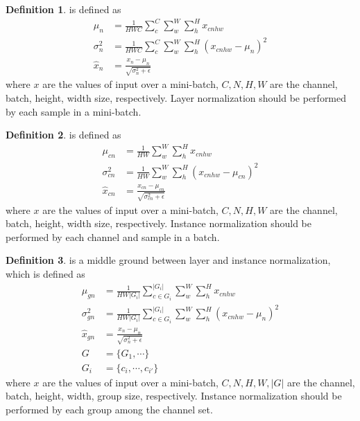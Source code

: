 \documentclass[a4paper]{article}
\theoremstyle{definition}
\newtheorem{definition}{Definition}
\theoremstyle{plain}
\begin{document}
\begin{definition}
 is defined as
\begin{align*}
     \mu_{n}&=\frac{1}{HWC}\sum^C_c\sum^W_w\sum^H_h x_{cnhw}\\
     \sigma_{n}^2&=\frac{1}{HWC}\sum^C_c\sum^W_w\sum^H_h(x_{cnhw}-\mu_n)^2\\
     \hat{x}_{n}&=\frac{x_{n}-\mu_{n}}{\sqrt{\sigma_{n}^2+\epsilon}}
\end{align*}
where $x$ are the values of input over a mini-batch, $C,N,H,W$ are the channel, batch, height, width size, respectively. Layer normalization should be performed by each sample in a mini-batch.
\end{definition}

\begin{definition}
 is defined as
\begin{align*}
     \mu_{cn}&=\frac{1}{HW}\sum^W_w\sum^H_h x_{cnhw}\\
     \sigma_{cn}^2&=\frac{1}{HW}\sum^W_w\sum^H_h(x_{cnhw}-\mu_{cn})^2\\
     \hat{x}_{cn}&=\frac{x_{cn}-\mu_{cn}}{\sqrt{\sigma_{cn}^2+\epsilon}}
\end{align*}
where $x$ are the values of input over a mini-batch, $C,N,H,W$ are the channel, batch, height, width size, respectively. Instance normalization should be performed by each channel and sample in a batch.
\end{definition}

\begin{definition}
\cite{group} is a middle ground between layer and instance normalization, which is defined as
\begin{align*}
     \mu_{gn}&=\frac{1}{HW|G_i|}\sum^{|G_i|}_{c\in G_i}\sum^W_w\sum^H_h x_{cnhw}\\
     \sigma_{gn}^2&=\frac{1}{HW|G_i|}\sum^{|G_i|}_{c\in G_i}\sum^W_w\sum^H_h(x_{cnhw}-\mu_n)^2\\
     \hat{x}_{gn}&=\frac{x_{n}-\mu_{n}}{\sqrt{\sigma_{n}^2+\epsilon}}\\
     G&=\{G_1,\cdots\}\\
     G_i&=\{c_i,\cdots,c_{i'}\}
\end{align*}
where $x$ are the values of input over a mini-batch, $C,N,H,W,|G|$ are the channel, batch, height, width, group size, respectively. Instance normalization should be performed by each group among the channel set.
\end{definition}
\end{document}
